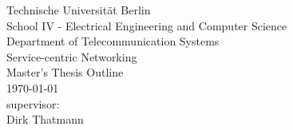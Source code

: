 \begin{titlepage}
\begin{center}
	 	\vspace{0.5cm}
		Technische Universität Berlin\\
		School IV - Electrical Engineering and Computer Science\\
		Department of Telecommunication Systems\\
		Service-centric Networking\\
		\vspace{0.5cm}
		Master's Thesis Outline\\
		\vspace{2.2cm}
		\today\\
		\vspace{2.0cm}
		\large
		\vspace{1cm}
		supervisor:\\
		Dirk Thatmann
		\end{center}
\end{titlepage}

